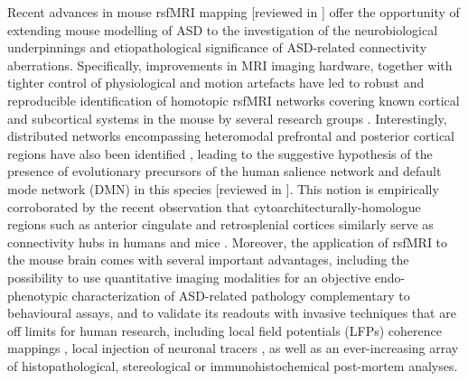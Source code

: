 Recent advances in mouse rsfMRI mapping [reviewed in \parencite{gozzi2016}]
offer the opportunity of extending mouse modelling of ASD to the investigation
of the neurobiological underpinnings and etiopathological significance of
ASD-related connectivity aberrations. Specifically, improvements in MRI imaging
hardware, together with tighter control of physiological and motion artefacts
\parencite{ferrari2012, weber2006} have led to robust and reproducible
identification of homotopic rsfMRI networks covering known cortical and
subcortical systems in the mouse by several research groups
\parencite{mechling2014, nasrallah2014, sforazzini2014, shah2016, zerbi2015}.
Interestingly, distributed networks encompassing heteromodal prefrontal and
posterior cortical regions have also been identified \parencite{sforazzini2014,
shah2016, zerbi2015}, leading to the suggestive hypothesis of the presence of
evolutionary precursors of the human salience network and default mode network
(DMN) in this species [reviewed in \parencite{gozzi2016}]. This notion is
empirically corroborated by the recent observation that
cytoarchitecturally-homologue regions such as anterior cingulate and
retrosplenial cortices \parencite{vogt2014} similarly serve as connectivity hubs
in humans and mice \parencite{cole2010, liska2015, tomasi2011}. Moreover, the
application of rsfMRI to the mouse brain comes with several important
advantages, including the possibility to use quantitative imaging modalities for
an objective endo-phenotypic characterization of ASD-related pathology
complementary to behavioural assays, and to validate its readouts with invasive
techniques that are off limits for human research, including local field
potentials (LFPs) coherence mappings \parencite{zhan2014}, local injection of
neuronal tracers \parencite{sforazzini2016}, as well as an ever-increasing array
of histopathological, stereological or immunohistochemical post-mortem analyses.

